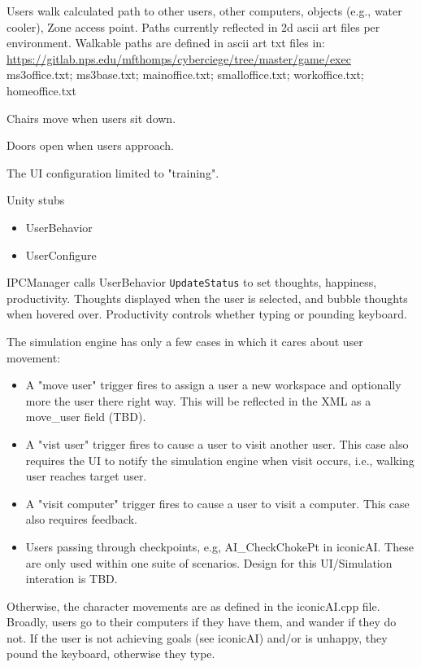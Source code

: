 \documentclass{article}
\begin{document}
Users walk calculated path to other users, other computers,
objects (e.g., water cooler), Zone access point.  Paths currently
reflected in 2d ascii art files per environment.
Walkable paths are defined in ascii art txt files in: \newline
\url{https://gitlab.nps.edu/mfthomps/cyberciege/tree/master/game/exec}
ms3office.txt; ms3base.txt; mainoffice.txt; smalloffice.txt; workoffice.txt; homeoffice.txt

Chairs move when users sit down.

Doors open when users approach.

The UI configuration limited to "training".

\noindent Unity stubs 
\begin{itemize}
\item UserBehavior
\item UserConfigure
\end{itemize}

IPCManager calls UserBehavior {\tt UpdateStatus} to set thoughts, happiness, productivity.  
Thoughts displayed when the user is selected, and bubble thoughts when hovered over.
Productivity controls whether typing or pounding keyboard.

The simulation engine has only a few cases in which it cares about user movement:
\begin{itemize}
	\item A "move user" trigger fires to assign a user a new workspace and optionally more the user
		there right way.  This will be reflected in the XML as a move\_user field (TBD).
	\item A "vist user" trigger fires to cause a user to visit another user.  This case also requires
		the UI to notify the simulation engine when visit occurs, i.e., walking user reaches target user.
	\item A "visit computer" trigger fires to cause a user to visit a computer.  This case also requires feedback.
	\item Users passing through checkpoints, e.g, AI\_CheckChokePt in iconicAI.  These are only used
		within one suite of scenarios.  Design for this UI/Simulation interation is TBD.
\end{itemize}
Otherwise, the character movements are as defined in the iconicAI.cpp file.  Broadly, users go to their computers
if they have them, and wander if they do not.  If the user is not achieving goals (see iconicAI) and/or is unhappy,
they pound the keyboard, otherwise they type.
\end{document}
